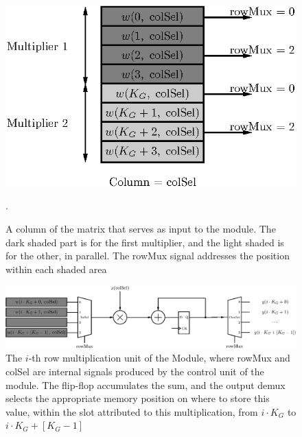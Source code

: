 \begin{figure}
    \centering
    \includegraphics[width=0.9\linewidth]{figures/mem-array-prod.eps}
    \caption[A column of the matrix that serves as input to the module]{A column of the matrix that serves as input to the module. The dark shaded part is for the first multiplier, and the light shaded is for the other, in parallel. The rowMux signal addresses the position within each shaded area}.
    \label{fig:mem-arrayprod}
\end{figure}

\begin{figure}
    \centering
    \includegraphics[width=\linewidth]{figures/array-prod.eps}
    \caption[The $i$-th row multiplication unit of the Module]{The $i$-th row multiplication unit of the Module, where rowMux and colSel are internal signals produced by the control unit of the module. The flip-flop accumulates the sum, and the output demux selects the appropriate memory position on where to store this value, within the slot attributed to this multiplication, from $i\cdot K_G$ to $i\cdot K_G + \left[K_G-1\right]$}
    \label{fig:array-prod}
\end{figure}



